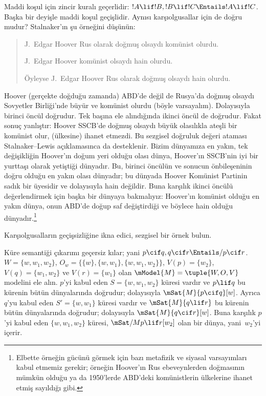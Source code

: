 



Maddi koşul için zincir kuralı geçerlidir:
$!A\lif !B,!B\lif !C\Entails !A\lif !C$. Başka bir deyişle maddi koşul
geçişlidir. Aynısı karşıolgusallar için de doğru mudur? Stalnaker'ın şu
örneğini düşünün:
\begin{quote}
  J.~Edgar Hoover Rus olarak doğmuş olsaydı komünist olurdu.

  J.~Edgar Hoover komünist olsaydı hain olurdu.

  Öyleyse J.~Edgar Hoover Rus olarak doğmuş olsaydı hain olurdu.
\end{quote}
Hoover (gerçekte doğduğu zamanda) ABD'de değil de Rusya'da doğmuş olsaydı
Sovyetler Birliği'nde büyür ve komünist olurdu (böyle varsayalım). Dolayısıyla
birinci öncül doğrudur. Tek başına ele alındığında ikinci öncül de doğrudur.
Fakat sonuç yanlıştır: Hoover SSCB'de doğmuş olsaydı büyük olasılıkla ateşli
bir komünist olur, (ülkesine) ihanet etmezdi. Bu sezgisel doğruluk değeri
ataması Stalnaker--Lewis açıklamasınca da desteklenir. Bizim dünyamıza en
yakın, tek değişikliğin Hoover'ın doğum yeri olduğu olası dünya, Hoover'ın
SSCB'nin iyi bir yurttaşı olarak yetiştiği dünyadır. Bu, birinci öncülün ve
sonucun önbileşeninin doğru olduğu en yakın olası dünyadır; bu dünyada Hoover
Komünist Partinin sadık bir üyesidir ve dolayısıyla hain değildir. Buna
karşılık ikinci öncülü değerlendirmek için başka bir dünyaya bakmalıyız:
Hoover'ın komünist olduğu en yakın dünya, onun ABD'de doğup saf değiştirdiği
ve böylece hain olduğu dünyadır.\footnote{Elbette örneğin gücünü görmek için
  bazı metafizik ve siyasal varsayımları kabul etmemiz gerekir; örneğin
  Hoover'ın Rus ebeveynlerden doğmasının mümkün olduğu ya da 1950'lerde
  ABD'deki komünistlerin ülkelerine ihanet etmiş sayıldığı gibi.}

\begin{prob}
  Karşıolgusalların geçişsizliğine ikna edici, sezgisel bir örnek bulun.
\end{prob}

\begin{ex}
  Küre semantiği çıkarımı geçersiz kılar; yani
  $p\cif q,q\cif r\Entails/ p\cif r$. $W=\{w,w_1,w_2\}$,
  $O_w=\{\{w\},\{w,w_1\},\{w,w_1,w_2\}\}$,
  $V(p)=\{w_2\}$, $V(q)=\{w_1,w_2\}$ ve $V(r)=\{w_1\}$ olan
  $\mModel{M}=\tuple{W,O,V}$ modelini ele alın. $p$'yi kabul eden
  $S=\{w,w_1,w_2\}$ küresi vardır ve $p\lif q$ bu kürenin bütün
  dünyalarında doğrudur; dolayısıyla $\mSat{M}{p\cif q}[w]$. Ayrıca $q$'yu
  kabul eden $S'=\{w,w_1\}$ küresi vardır ve $\mSat{M}{q\lif r}$ bu
  kürenin bütün dünyalarında doğrudur; dolayısıyla $\mSat{M}{q\cif r}[w]$.
  Buna karşılık $p$'yi kabul eden $\{w,w_1,w_2\}$ küresi,
  $\mSat/{M}{p\lif r}[w_2]$ olan bir dünya, yani~$w_2$'yi içerir.
\end{ex}

